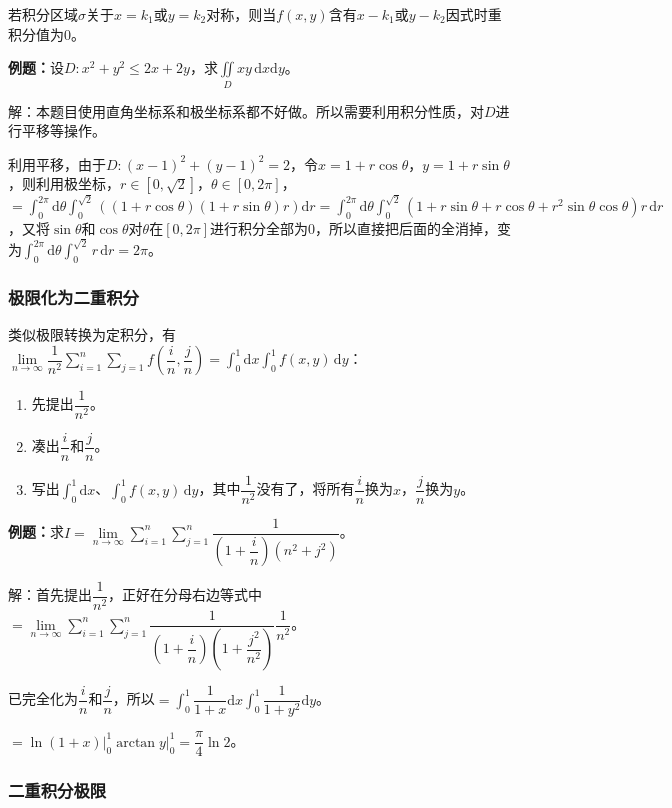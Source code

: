 若积分区域$\sigma$关于$x=k_1$或$y=k_2$对称，则当$f(x,y)$含有$x-k_1$或$y-k_2$因式时重积分值为0。

\textbf{例题：}设$D:x^2+y^2\leqslant2x+2y$，求$\iint\limits_Dxy\,\textrm{d}x\textrm{d}y$。

解：本题目使用直角坐标系和极坐标系都不好做。所以需要利用积分性质，对$D$进行平移等操作。

利用平移，由于$D:(x-1)^2+(y-1)^2=2$，令$x=1+r\cos\theta$，$y=1+r\sin\theta$，则利用极坐标，$r\in[0,\sqrt{2}]$，$\theta\in[0,2\pi]$，$=\int_0^{2\pi}\textrm{d}\theta\int_0^{\sqrt{2}}((1+r\cos\theta)(1+r\sin\theta)r)\textrm{d}r=\int_0^{2\pi}\textrm{d}\theta\int_0^{\sqrt{2}}(1+r\sin\theta+r\cos\theta+r^2\sin\theta\cos\theta)r\,\textrm{d}r$，又将$\sin\theta$和$\cos\theta$对$\theta$在$[0,2\pi]$进行积分全部为0，所以直接把后面的全消掉，变为$\int_0^{2\pi}\textrm{d}\theta\int_0^{\sqrt{2}}r\,\textrm{d}r=2\pi$。

\subsubsection{极限化为二重积分}

类似极限转换为定积分，有$\lim\limits_{n\to\infty}\dfrac{1}{n^2}\sum\limits_{i=1}^n\sum\limits_{j=1}f\left(\dfrac{i}{n},\dfrac{j}{n}\right)=\int_0^1\textrm{d}x\int_0^1f(x,y)\,\textrm{d}y$：

\begin{enumerate}
    \item 先提出$\dfrac{1}{n^2}$。
    \item 凑出$\dfrac{i}{n}$和$\dfrac{j}{n}$。
    \item 写出$\int_0^1\textrm{d}x$、$\int_0^1f(x,y)\,\textrm{d}y$，其中$\dfrac{1}{n^2}$没有了，将所有$\dfrac{i}{n}$换为$x$，$\dfrac{j}{n}$换为$y$。
\end{enumerate}

\textbf{例题：}求$I=\lim\limits_{n\to\infty}\sum\limits_{i=1}^n\sum\limits_{j=1}^n\dfrac{1}{\left(1+\dfrac{i}{n}\right)(n^2+j^2)}$。

解：首先提出$\dfrac{1}{n^2}$，正好在分母右边等式中$=\lim\limits_{n\to\infty}\sum\limits_{i=1}^n\sum\limits_{j=1}^n\dfrac{1}{\left(1+\dfrac{i}{n}\right)(1+\dfrac{j^2}{n^2})}\dfrac{1}{n^2}$。

已完全化为$\dfrac{i}{n}$和$\dfrac{j}{n}$，所以$=\displaystyle{\int_0^1\dfrac{1}{1+x}\textrm{d}x\int_0^1\dfrac{1}{1+y^2}\textrm{d}y}$。

$=\ln(1+x)\vert_0^1\arctan y\vert_0^1=\dfrac{\pi}{4}\ln2$。

\subsubsection{二重积分极限}

